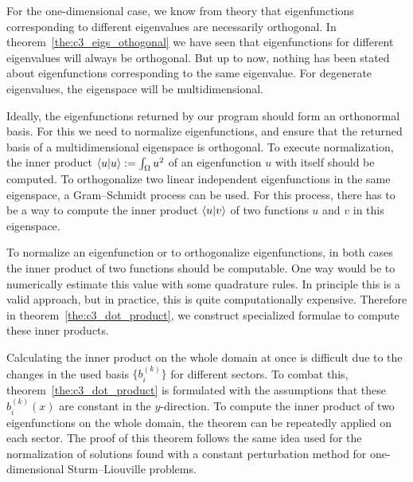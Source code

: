 For the one-dimensional case, we know from theory that eigenfunctions corresponding to different eigenvalues are necessarily orthogonal. In theorem~\ref{the:c3_eigs_othogonal} we have seen that eigenfunctions for different eigenvalues will always be orthogonal. But up to now, nothing has been stated about eigenfunctions corresponding to the same eigenvalue. For degenerate eigenvalues, the eigenspace will be multidimensional.

Ideally, the eigenfunctions returned by our program should form an orthonormal basis. For this we need to normalize eigenfunctions, and ensure that the returned basis of a multidimensional eigenspace is orthogonal. To execute normalization, the inner product $\bra{u}\ket{u} := \int_\Omega u^2$  of an eigenfunction $u$ with itself should be computed. To orthogonalize two linear independent eigenfunctions in the same eigenspace, a Gram--Schmidt process can be used. For this process, there has to be a way to compute the inner product $\bra{u}\ket{v}$ of two functions $u$ and $v$ in this eigenspace.

To normalize an eigenfunction or to orthogonalize eigenfunctions, in both cases the inner product of two functions should be computable. One way would be to numerically estimate this value with some quadrature rules. In principle this is a valid approach, but in practice, this is quite computationally expensive. Therefore in theorem~\ref{the:c3_dot_product}, we construct specialized formulae to compute these inner products.

Calculating the inner product on the whole domain at once is difficult due to the changes in the used basis $\{b_i^{(k)}\}$ for different sectors. To combat this, theorem~\ref{the:c3_dot_product} is formulated with the assumptions that these $b_i^{(k)}(x)$ are constant in the $y$-direction. To compute the inner product of two eigenfunctions on the whole domain, the theorem can be repeatedly applied on each sector. The proof of this theorem follows the same idea used for the normalization of solutions found with a constant perturbation method for one-dimensional Sturm--Liouville problems.

